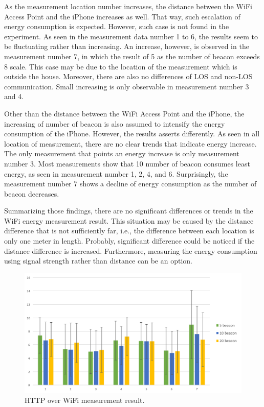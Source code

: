 \documentclass[journal]{vgtc}                %
\begin{document}
As the measurement location number increases, the distance between the WiFi Access Point and the iPhone increases as well. That way, such escalation of energy consumption is expected. However, such case is not found in the experiment. As seen in the measurement data number 1 to 6, the results seem to be fluctuating rather than increasing. An increase, however, is observed in the measurement number 7, in which the result of 5 as the number of beacon exceeds 8 scale. This case may be due to the location of the measurement which is outside the house. Moreover, there are also no differences of LOS and non-LOS communication. Small increasing is only observable in measurement number 3 and 4.

Other than the distance between the WiFi Access Point and the iPhone, the increasing of number of beacon is also assumed to intensify the energy consumption of the iPhone. However, the results asserts differently. As seen in all location of measurement, there are no clear trends that indicate energy increase. The only measurement that points an energy increase is only measurement number 3. Most measurements show that 10 number of beacon consumes least energy, as seen in measurement number 1, 2, 4, and 6. Surprisingly, the measurement number 7 shows a decline of energy consumption as the number of beacon decreases.

Summarizing those findings, there are no significant differences or trends in the WiFi energy measurement result. This situation may be caused by the distance difference that is not sufficiently far, i.e., the difference between each location is only one meter in length. Probably, significant difference could be noticed if the distance difference is increased. Furthermore, measuring the energy consumption using signal strength rather than distance can be an option.

\begin{figure}
  \centering
    \includegraphics[width=.5\textwidth]{wifi}
  \caption{HTTP over WiFi measurement result.}
  \label{fig:wifi-result}
\end{figure}
\end{document}
